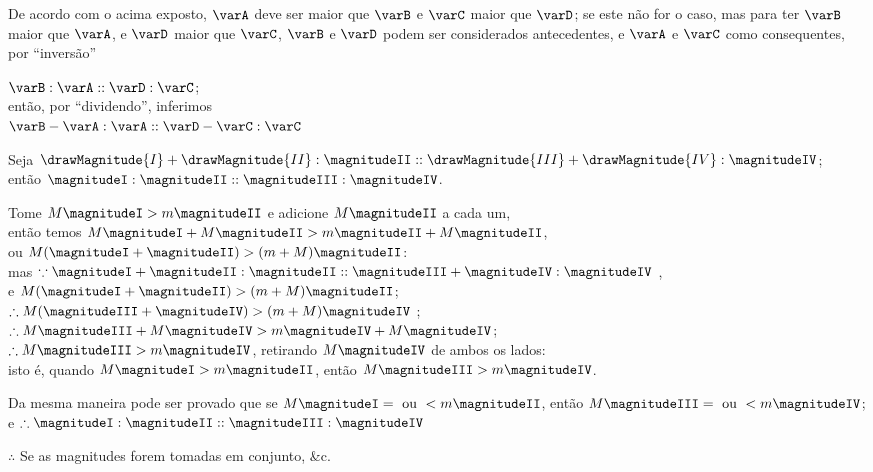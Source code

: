 \documentclass[booklanguage=brazilian]{byrnebook}
\begin{document}
De acordo com o acima exposto, $\varA$ deve ser maior que $\varB$ e $\varC$ maior que $\varD$; se este não for o caso, mas para ter $\varB$ maior que $\varA$, e $\varD$ maior que $\varC$, $\varB$ e $\varD$ podem ser considerados antecedentes, e $\varA$ e $\varC$ como consequentes, por \enquote{inversão}

\begin{center}
$\varB : \varA :: \varD : \varC$;\\
então, por \enquote{dividendo}, inferimos\\
$\varB - \varA : \varA :: \varD - \varC : \varC$ %
\end{center}

\vfill\pagebreak

\label{prop:V.XVII}

\begin{center}
Seja $\drawMagnitude{I} + \drawMagnitude{II} : \magnitudeII :: \drawMagnitude{III} + \drawMagnitude{IV} : \magnitudeIV$;\\
então $\magnitudeI : \magnitudeII :: \magnitudeIII : \magnitudeIV$.

Tome $M \magnitudeI > m \magnitudeII$ e adicione $M \magnitudeII$ a cada um,\\
então temos $M \magnitudeI + M \magnitudeII > m \magnitudeII + M \magnitudeII$,\\
ou $M (\magnitudeI + \magnitudeII) > (m + M) \magnitudeII$:\\
mas $\because \magnitudeI + \magnitudeII: \magnitudeII :: \magnitudeIII + \magnitudeIV: \magnitudeIV$ \byref{\hypref},\\ %
e $M (\magnitudeI + \magnitudeII) > (m + M) \magnitudeII$;\\
$\therefore M(\magnitudeIII + \magnitudeIV) > (m + M) \magnitudeIV$ ;\\
$\therefore M \magnitudeIII + M \magnitudeIV > m \magnitudeIV + M \magnitudeIV$;\\
$\therefore M \magnitudeIII > m \magnitudeIV$, retirando $M \magnitudeIV$ de ambos os lados:\\
isto é, quando $M \magnitudeI > m \magnitudeII$, então $M \magnitudeIII > m \magnitudeIV$.

Da mesma maneira pode ser provado que se $M \magnitudeI = \mbox{ ou } < m \magnitudeII$, então $M \magnitudeIII = \mbox{ ou } < m \magnitudeIV$;\\
e $\therefore \magnitudeI : \magnitudeII :: \magnitudeIII : \magnitudeIV$ 

$\therefore$ Se as magnitudes forem tomadas em conjunto, \&c.
\end{center}
\end{document}
